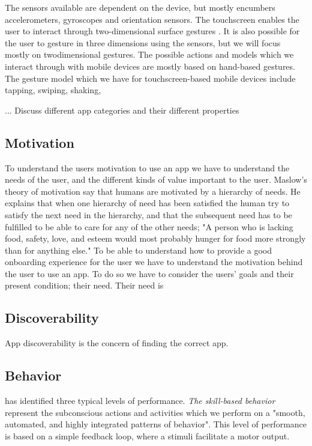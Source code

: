 The sensors available are dependent on the device, but mostly encumbers accelerometers, gyroscopes and orientation sensors. The touchscreen enables the user to interact through two-dimensional surface gestures \cite{Ruiz2011}. It is also possible for the user to gesture in three dimensions using the sensors, but we will focus mostly on twodimensional gestures. The possible actions and models which we interact through with mobile devices are mostly based on hand-based gestures. The gesture model which we have for touchscreen-based mobile devices include tapping, swiping, shaking,

... Discuss different app categories and their different properties

\subsection{Motivation}
To understand the users motivation to use an app we have to understand the needs of the user, and the different kinds of value important to the user. Maslow’s theory of motivation \cite{Maslow1943} say that humans are motivated by a hierarchy of needs. He explains that when one hierarchy of need has been satisfied the human try to satisfy the next need in the hierarchy, and that the subsequent need has to be fulfilled to be able to care for any of the other needs; "A person who is lacking food, safety, love, and esteem would most probably hunger for food more strongly than for anything else." To be able to understand how to provide a good onboarding experience for the user we have to understand the motivation behind the user to use an app. To do so we have to consider the users’ goals and their present condition; their need. Their need is

\subsection{Discoverability}
App discoverability is the concern of finding the correct app. 

\subsection{Behavior}
\cite{Rasmussen1983} has identified three typical levels of performance. \textit{The skill-based behavior} represent the subconscious actions and activities which we perform on a "smooth, automated, and highly integrated patterns of behavior". This level of performance is based on a simple feedback loop, where a stimuli facilitate a motor output. 

